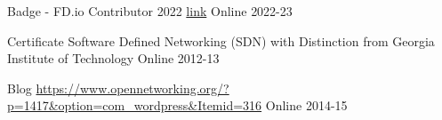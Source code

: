 
\begin{cvhonors}


  \cvhonor
    {Badge - FD.io Contributor 2022} %
    {\href{https://www.credly.com/badges/13658000-e4c5-4e0c-9229-bd52d6af56d9/linked_in_profile}{link}}
    {Online} %
    {2022-23} %

  \cvhonor
    {Certificate} %
    {Software Defined Networking (SDN) with Distinction from Georgia Institute of Technology}
    {Online} %
    {2012-13} %

  \cvhonor
    {Blog} %
    {\url{https://www.opennetworking.org/?p=1417&option=com_wordpress&Itemid=316}} %
    {Online} %
    {2014-15} %

\end{cvhonors}
